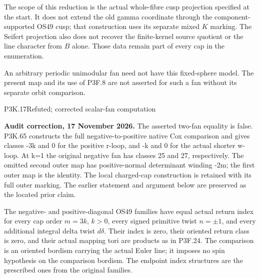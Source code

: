 The scope of this reduction is the actual whole-fibre cusp
projection specified at the start.  It does not extend the old
gamma coordinate through the component-supported OS49 cusp;
that construction uses its separate mixed \(K\) marking.
The Seifert projection also does not recover the finite-kernel
source quotient or the line character from \(B\) alone.
Those data remain part of every cap in the enumeration.

An arbitrary periodic unimodular fan need not have this fixed-sphere
model.  The present map and its use of P3F.8 are not asserted for
such a fan without its separate orbit comparison.

\begin{statement}{P3K.17}{Refuted; corrected scalar-fan computation}
\par\noindent\textbf{Audit correction, 17 November 2026.} The asserted two-fan equality is false. P3K.65 constructs the full negative-to-positive native Cox comparison and gives classes -3k and 0 for the positive r-loop, and -k and 0 for the actual shorter w-loop. At k=1 the original negative fan has classes 25 and 27, respectively. The omitted second outer map has positive-normal determinant winding -2m; the first outer map is the identity. The local charged-cap construction is retained with its full outer marking. The earlier statement and argument below are preserved as the located prior claim.
\medskip

The negative- and positive-diagonal OS49 families have equal
actual return index for every cap order \(m=3k\),
\(k>0\), every signed primitive twist \(n=\pm1\),
and every additional integral delta twist \(d\delta\).
Their index is zero, their oriented return class is zero, and
their actual mapping tori are products as in P3F.24.
The comparison is an oriented bordism carrying the actual
Euler line; it imposes no spin hypothesis on the comparison
bordism.  The endpoint index structures are the prescribed
ones from the original families.
\end{statement}

